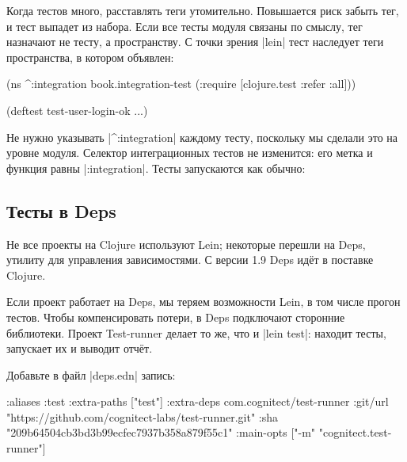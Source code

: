 Когда тестов много, расставлять теги утомительно. Повышается риск забыть тег, и
тест выпадет из набора. Если все тесты модуля связаны по смыслу, тег назначают
не тесту, а пространству. С точки зрения \spverb|lein| тест наследует теги
пространства, в котором объявлен:

\begin{english}
  \begin{clojure}
(ns ^:integration
  book.integration-test
  (:require [clojure.test :refer :all]))

(deftest test-user-login-ok
  ...)
  \end{clojure}
\end{english}

Не нужно указывать \spverb|^:integration| каждому тесту, поскольку мы сделали
это на уровне модуля. Селектор интеграционных тестов не изменится: его метка и
функция равны \spverb|:integration|. Тесты запускаются как обычно:

\begin{english}
\end{english}

\subsection{Тесты в Deps}


Не все проекты на Clojure используют Lein; некоторые перешли на
Deps, утилиту для управления
зависимостями. С версии 1.9 Deps ид\"{е}т в поставке Clojure.


Если проект работает на Deps, мы теряем возможности Lein, в том числе прогон
тестов. Чтобы компенсировать потери, в Deps подключают сторонние
библиотеки. Проект Test-runner
делает то же, что и \spverb|lein test|: находит тесты, запускает их и выводит
отч\"{е}т.

Добавьте в файл \spverb|deps.edn| запись:

\begin{english}
  \begin{clojure}
:aliases
{:test
 {:extra-paths ["test"]
  :extra-deps
  {com.cognitect/test-runner
   {:git/url "https://github.com/cognitect-labs/test-runner.git"
    :sha "209b64504cb3bd3b99ecfec7937b358a879f55c1"}}
  :main-opts ["-m" "cognitect.test-runner"]}}
  \end{clojure}
\end{english}

